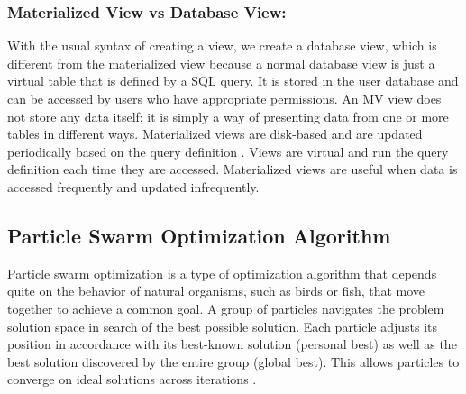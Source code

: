 \subsubsection{Materialized View vs Database View:} With the usual syntax of creating a view, we create a database view, which is different from the materialized view because a normal database view is just a virtual table that is defined by a SQL query. It is stored in the user database and can be accessed by users who have appropriate permissions. An MV view does not store any data itself; it is simply a way of presenting data from one or more tables in different ways. Materialized views are disk-based and are updated periodically based on the query definition \cite{Stackoverflow-author-08-2008}. Views are virtual and run the query definition each time they are accessed. Materialized views are useful when data is accessed frequently and updated infrequently.

\subsection{Particle Swarm Optimization Algorithm}
Particle swarm optimization is a type of optimization algorithm that depends quite on the behavior of natural organisms, such as birds or fish, that move together to achieve a common goal. A group of particles navigates the problem solution space in search of the best possible solution. Each particle adjusts its position in accordance with its best-known solution (personal best) as well as the best solution discovered by the entire group (global best). This allows particles to converge on ideal solutions across iterations \cite{subhasis-2023}.\vspace{.4cm}

